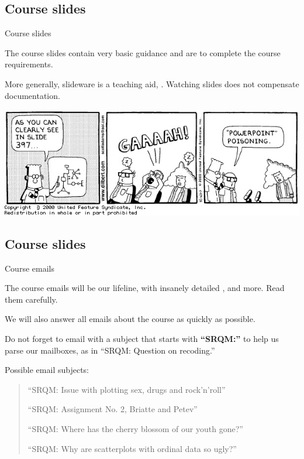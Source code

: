 \documentclass{beamer}
\begin{document}
	\subsection{Course slides}

	\begin{frame}[t]{Course slides}

		The course slides contain very basic guidance and are  to complete the course requirements.\vspace{1em}
		
		More generally, slideware is a teaching aid, . Watching slides does not compensate documentation.\vspace{1em}
	
		\includegraphics[width=\textwidth]{images/dilbert-ppt.jpg}

	\end{frame}

	\subsection{Course slides}

	\begin{frame}[t]{Course emails}

		The course emails will be our lifeline, with insanely detailed , and more. Read them carefully.\vspace{1em}
		
		We will also answer all emails about the course as quickly as possible. \textbf{}\vspace{1em}
		
		Do not forget to email with a subject that starts with \textbf{``SRQM:''} to help us parse our mailboxes, as in ``SRQM: Question on recoding.''\vspace{1em}
		
		Possible email subjects:
		
		\begin{quote}
		``SRQM: Issue with plotting sex, drugs and rock'n'roll''
		
		``SRQM: Assignment No. 2, Briatte and Petev''
		
		``SRQM: Where has the cherry blossom of our youth gone?''
		
		``SRQM: Why are scatterplots with ordinal data so ugly?''
		\end{quote}
	
	\end{frame}
\end{document}
